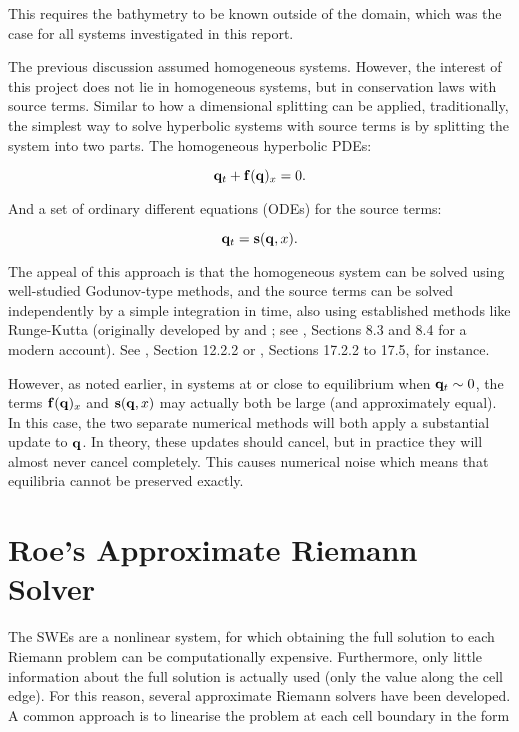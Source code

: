 This requires the bathymetry to be known outside of the domain, which was the case for all systems investigated in this report.

The previous discussion assumed homogeneous systems. However, the interest of this project does not lie in homogeneous systems, but in conservation laws with source terms. Similar to how a dimensional splitting can be applied, traditionally, the simplest way to solve hyperbolic systems with source terms is by splitting the system into two parts. The homogeneous hyperbolic PDEs:

$$
  \vb q_t + \vb f(\vb q)_x = 0.
$$

And a set of ordinary different equations (ODEs) for the source terms:

$$
  \vb q_t = \vb s(\vb q, x).
$$

The appeal of this approach is that the homogeneous system can be solved using well-studied Godunov-type methods, and the source terms can be solved independently by a simple integration in time, also using established methods like Runge-Kutta (originally developed by \citet{runge1895numerische} and \citet{kutta1901beitrag}; see \cite{kaw2009numerical}, Sections 8.3 and 8.4 for a modern account). See \cite{toro2001shock}, Section 12.2.2 or \cite{leveque2002finite}, Sections 17.2.2 to 17.5, for instance.

However, as noted earlier, in systems at or close to equilibrium when $\vb q_t \sim 0$, the terms $\vb f(\vb q)_x$ and $\vb s(\vb q, x)$ may actually both be large (and approximately equal). In this case, the two separate numerical methods will both apply a substantial update to $\vb q$. In theory, these updates should cancel, but in practice they will almost never cancel completely. This causes numerical noise which means that equilibria cannot be preserved exactly.

\section{Roe's Approximate Riemann Solver}
\label{sec:roe}

The SWEs are a nonlinear system, for which obtaining the full solution to each Riemann problem can be computationally expensive. Furthermore, only little information about the full solution is actually used (only the value along the cell edge). For this reason, several approximate Riemann solvers have been developed. A common approach is to linearise the problem at each cell boundary in the form

